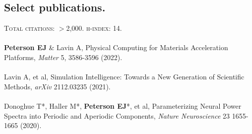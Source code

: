 \documentclass[margin,line]{res}
\begin{document}
\begin{resume}
\section{\sc Select publications.}
\textsc{Total citations}: $>$2,000. \textsc{h-index}: 14.
\\ 
\vspace{-.4cm} 
\\
\textbf{Peterson EJ} \& Lavin A, Physical Computing for Materials Acceleration Platforms, \textit{Matter} 5, 3586-3596 (2022).
\\ 
\vspace{-.35cm} 
\\
Lavin A, et al, Simulation Intelligence: Towards a New Generation of Scientific Methods, \emph{arXiv} 2112.03235 (2021).
\\ 
\vspace{-.35cm} 
\\
Donoghue T*, Haller M*, \textbf{Peterson EJ}*, et al, Parameterizing Neural Power Spectra into Periodic and Aperiodic Components, \emph{Nature Neuroscience} 23 1655-1665 (2020). 

\end{resume}
\end{document}
